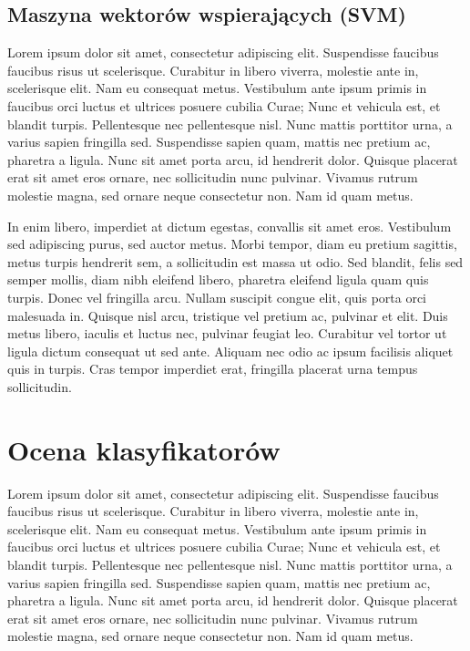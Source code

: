 	\subsection{Maszyna wektorów wspierających (SVM)}
	Lorem ipsum dolor sit amet, consectetur adipiscing elit. Suspendisse faucibus faucibus risus ut scelerisque. Curabitur in libero viverra, molestie ante in, scelerisque elit. Nam eu consequat metus. Vestibulum ante ipsum primis in faucibus orci luctus et ultrices posuere cubilia Curae; Nunc et vehicula est, et blandit turpis. Pellentesque nec pellentesque nisl. Nunc mattis porttitor urna, a varius sapien fringilla sed. Suspendisse sapien quam, mattis nec pretium ac, pharetra a ligula. Nunc sit amet porta arcu, id hendrerit dolor. Quisque placerat erat sit amet eros ornare, nec sollicitudin nunc pulvinar. Vivamus rutrum molestie magna, sed ornare neque consectetur non. Nam id quam metus.

	In enim libero, imperdiet at dictum egestas, convallis sit amet eros. Vestibulum sed adipiscing purus, sed auctor metus. Morbi tempor, diam eu pretium sagittis, metus turpis hendrerit sem, a sollicitudin est massa ut odio. Sed blandit, felis sed semper mollis, diam nibh eleifend libero, pharetra eleifend ligula quam quis turpis. Donec vel fringilla arcu. Nullam suscipit congue elit, quis porta orci malesuada in. Quisque nisl arcu, tristique vel pretium ac, pulvinar et elit. Duis metus libero, iaculis et luctus nec, pulvinar feugiat leo. Curabitur vel tortor ut ligula dictum consequat ut sed ante. Aliquam nec odio ac ipsum facilisis aliquet quis in turpis. Cras tempor imperdiet erat, fringilla placerat urna tempus sollicitudin.
	
\section{Ocena klasyfikatorów}
Lorem ipsum dolor sit amet, consectetur adipiscing elit. Suspendisse faucibus faucibus risus ut scelerisque. Curabitur in libero viverra, molestie ante in, scelerisque elit. Nam eu consequat metus. Vestibulum ante ipsum primis in faucibus orci luctus et ultrices posuere cubilia Curae; Nunc et vehicula est, et blandit turpis. Pellentesque nec pellentesque nisl. Nunc mattis porttitor urna, a varius sapien fringilla sed. Suspendisse sapien quam, mattis nec pretium ac, pharetra a ligula. Nunc sit amet porta arcu, id hendrerit dolor. Quisque placerat erat sit amet eros ornare, nec sollicitudin nunc pulvinar. Vivamus rutrum molestie magna, sed ornare neque consectetur non. Nam id quam metus.

